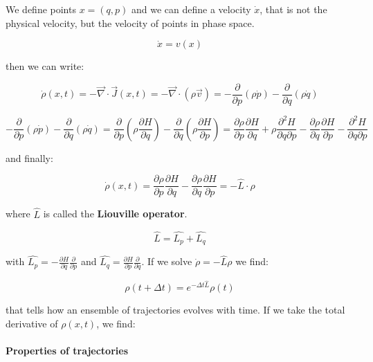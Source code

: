 \documentclass[a4paper, italian, openany]{book}
\begin{document}
We define points $x = (q, p)$ and we can define a velocity $\dot{x}$, that is not the physical velocity, but the velocity of points in phase space.

$$\dot{x} = v(x)$$

then we can write:

$$\dot{\rho}(x, t) = - \overrightarrow{\nabla} \cdot \overrightarrow{J} (x, t) = - \overrightarrow{\nabla} \cdot (\rho \overrightarrow{v} ) = -\frac{\partial}{\partial p} (\rho \dot{p}) - \frac{\partial}{\partial q}(\rho \dot{q})$$

$$-\frac{\partial}{\partial p} (\rho \dot{p}) - \frac{\partial}{\partial q}(\rho \dot{q}) =  \frac{\partial}{\partial p} \left ( \rho \frac{\partial H}{\partial q} \right ) -  \frac{\partial}{\partial q} \left ( \rho \frac{\partial H}{\partial p} \right ) = \frac{\partial \rho}{\partial p} \frac{\partial H}{\partial q} + \rho \frac{\partial^2 H}{\partial q \partial p} - \frac{\partial \rho}{\partial q} \frac{\partial H}{\partial p} - \frac{\partial^2 H}{\partial q \partial p}$$

and finally:

$$\dot{\rho}(x, t) = \frac{\partial \rho}{\partial p} \frac{\partial H}{\partial q} - \frac{\partial \rho}{\partial q} \frac{\partial H}{\partial p} = - \hat{L} \cdot \rho$$

where $\hat{L}$ is called the \textbf{Liouville operator}.

$$\hat{L} = \hat{L_p} + \hat{L_q}$$

with $\hat{L_p} = -\frac{\partial H}{\partial q} \frac{\partial}{\partial p}$ and $\hat{L_q} = \frac{\partial H}{\partial p} \frac{\partial}{\partial q}$. If we solve $\dot{\rho} = - \hat{L} \rho$ we find:

$$\rho(t+\Delta t) = e^{-\Delta t \hat{L}} \rho(t)$$

that tells how an ensemble of trajectories evolves with time. If we take the total derivative of $\rho (x, t)$, we find:

\paragraph{Properties of trajectories}
\end{document}
